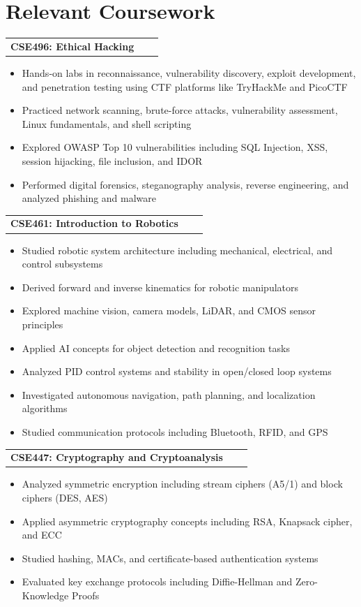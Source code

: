 \documentclass[a4paper,12pt]{article}
\makeatletter
\newenvironment{joblong}[2]
    {
    \begin{tabularx}{\linewidth}{@{}l X r@{}}
    \textbf{#1} & \hfill &  #2 \\[3.75pt]
    \end{tabularx}
    \begin{minipage}[t]{\linewidth}
    \begin{itemize}[nosep,after=\strut, leftmargin=1em, itemsep=3pt,label=--]
    }
    {
    \end{itemize}
    \end{minipage}    
    }
\makeatother
\begin{document}
\section{Relevant Coursework}

\begin{joblong}{CSE496: Ethical Hacking}{}
\item Hands-on labs in reconnaissance, vulnerability discovery, exploit development, and penetration testing using CTF platforms like TryHackMe and PicoCTF
\item Practiced network scanning, brute-force attacks, vulnerability assessment, Linux fundamentals, and shell scripting
\item Explored OWASP Top 10 vulnerabilities including SQL Injection, XSS, session hijacking, file inclusion, and IDOR
\item Performed digital forensics, steganography analysis, reverse engineering, and analyzed phishing and malware
\end{joblong}

\begin{joblong}{CSE461: Introduction to Robotics}{}
\item Studied robotic system architecture including mechanical, electrical, and control subsystems
\item Derived forward and inverse kinematics for robotic manipulators
\item Explored machine vision, camera models, LiDAR, and CMOS sensor principles
\item Applied AI concepts for object detection and recognition tasks
\item Analyzed PID control systems and stability in open/closed loop systems
\item Investigated autonomous navigation, path planning, and localization algorithms
\item Studied communication protocols including Bluetooth, RFID, and GPS
\end{joblong}

\begin{joblong}{CSE447: Cryptography and Cryptoanalysis}{}
\item Analyzed symmetric encryption including stream ciphers (A5/1) and block ciphers (DES, AES)
\item Applied asymmetric cryptography concepts including RSA, Knapsack cipher, and ECC
\item Studied hashing, MACs, and certificate-based authentication systems
\item Evaluated key exchange protocols including Diffie-Hellman and Zero-Knowledge Proofs
\end{joblong}
\end{document}
